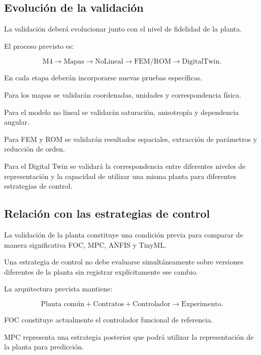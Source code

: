 \subsection{Evolución de la validación}

La validación deberá evolucionar junto con el nivel de fidelidad de la planta.

El proceso previsto es:

\begin{equation}
\mathrm{M4}
\rightarrow
\mathrm{Mapas}
\rightarrow
\mathrm{NoLineal}
\rightarrow
\mathrm{FEM/ROM}
\rightarrow
\mathrm{DigitalTwin}.
\end{equation}

En cada etapa deberán incorporarse nuevas pruebas específicas.

Para los mapas se validarán coordenadas, unidades y correspondencia física.

Para el modelo no lineal se validarán saturación, anisotropía y dependencia angular.

Para FEM y ROM se validarán resultados espaciales, extracción de parámetros y reducción de orden.

Para el Digital Twin se validará la correspondencia entre diferentes niveles de representación y la capacidad de utilizar una misma planta para diferentes estrategias de control.

\subsection{Relación con las estrategias de control}

La validación de la planta constituye una condición previa para comparar de manera significativa FOC, MPC, ANFIS y TinyML.

Una estrategia de control no debe evaluarse simultáneamente sobre versiones diferentes de la planta sin registrar explícitamente ese cambio.

La arquitectura prevista mantiene:

\begin{equation}
\text{Planta común}
+
\mathrm{Contratos}
+
\mathrm{Controlador}
\rightarrow
\mathrm{Experimento}.
\end{equation}

FOC constituye actualmente el controlador funcional de referencia.

MPC representa una estrategia posterior que podrá utilizar la representación de la planta para predicción.

